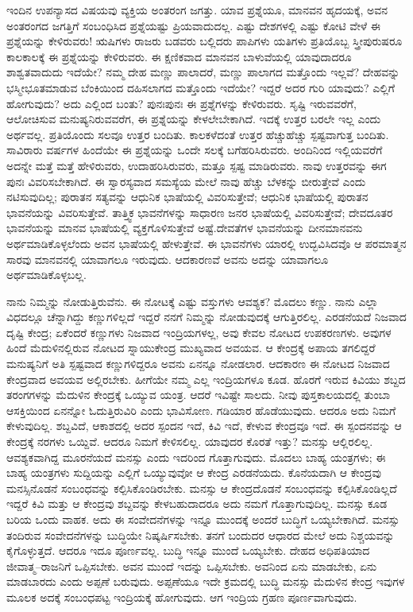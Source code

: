 \vskip 0.2cm

ಇಂದಿನ ಉಪನ್ಯಾಸದ ವಿಷಯವು ವ್ಯಕ್ತಿಯ ಅಂತರಂಗ ಜಗತ್ತು. ಯಾವ ಪ್ರಶ್ನೆಯೂ, ಮಾನವನ ಹೃದಯಕ್ಕೆ, ಅವನ ಅಂತರಂಗದ ಜಗತ್ತಿಗೆ ಸಂಬಂಧಿಸಿದ ಪ್ರಶ್ನೆಯಷ್ಟು ಪ್ರಿಯವಾದುದಲ್ಲ. ಎಷ್ಟು ದೇಶಗಳಲ್ಲಿ ಎಷ್ಟು ಕೋಟಿ ವೇಳೆ ಈ ಪ್ರಶ್ನೆಯನ್ನು ಕೇಳಿರುವರು! ಋಷಿಗಳು ರಾಜರು ಬಡವರು ಬಲ್ಲಿದರು ಪಾಪಿಗಳು ಯತಿಗಳು ಪ್ರತಿಯೊಬ್ಬ ಸ್ತ್ರೀಪುರುಷರೂ ಕಾಲಕಾಲಕ್ಕೆ ಈ ಪ್ರಶ್ನೆಯನ್ನು ಕೇಳಿರುವರು. ಈ ಕ್ಷಣಿಕವಾದ ಮಾನವನ ಬಾಳುವೆಯಲ್ಲಿ ಯಾವುದಾದರೂ ಶಾಶ್ವತವಾದುದು ಇದೆಯೇ? ನಮ್ಮ ದೇಹ ಮಣ್ಣು ಪಾಲಾದರೆ, ಮಣ್ಣು ಪಾಲಾಗದ ಮತ್ತೊಂದು ಇಲ್ಲವೆ? ದೇಹವನ್ನು ಭಸ್ಮೀಭೂತಮಾಡುವ ಬೆಂಕಿಯಿಂದ ದಹಿಸಲಾಗದ ಮತ್ತೊಂದು ಇದೆಯೇ? ಇದ್ದರೆ ಅದರ ಗುರಿ ಯಾವುದು? ಎಲ್ಲಿಗೆ ಹೋಗುವುದು? ಅದು ಎಲ್ಲಿಂದ ಬಂತು? ಪುನಃಪುನಃ ಈ ಪ್ರಶ್ನೆಗಳನ್ನು ಕೇಳಿರುವರು. ಸೃಷ್ಟಿ ಇರುವವರೆಗೆ, ಆಲೋಚಿಸುವ ಮನುಷ್ಯನಿರುವವರೆಗ, ಈ ಪ್ರಶ್ನೆಯನ್ನು ಕೇಳಲೇಬೇಕಾಗಿದೆ. ಇದಕ್ಕೆ ಉತ್ತರ ಬರಲೇ ಇಲ್ಲ ಎಂದು ಅರ್ಥವಲ್ಲ. ಪ್ರತಿಯೊಂದು ಸಲವೂ ಉತ್ತರ ಬಂದಿತು. ಕಾಲಕಳೆದಂತೆ ಉತ್ತರ ಹೆಚ್ಚುಹೆಚ್ಚು ಸ್ಪಷ್ಟವಾಗುತ್ತ ಬಂದಿತು. ಸಾವಿರಾರು ವರ್ಷಗಳ ಹಿಂದೆಯೇ ಈ ಪ್ರಶ್ನೆಯನ್ನು ಒಂದೇ ಸಲಕ್ಕೆ ಬಗೆಹರಿಸಿರುವರು. ಅಂದಿನಿಂದ ಇಲ್ಲಿಯವರೆಗೆ ಅದನ್ನೇ ಮತ್ತೆ ಮತ್ತೆ ಹೇಳಿರುವರು, ಉದಾಹರಿಸಿರುವರು, ಮತ್ತೂ ಸ್ಪಷ್ಟ ಮಾಡಿರುವರು. ನಾವು ಉತ್ತರವನ್ನು ಈಗ ಪುನಃ ವಿವರಿಸಬೇಕಾಗಿದೆ. ಈ ಸ್ವಾರಸ್ಯವಾದ ಸಮಸ್ಯೆಯ ಮೇಲೆ ನಾವು ಹೆಚ್ಚು ಬೆಳಕನ್ನು ಬೀರುತ್ತೇವೆ ಎಂದು ನಟಿಸುವುದಿಲ್ಲ; ಪುರಾತನ ಸತ್ಯವನ್ನು ಆಧುನಿಕ ಭಾಷೆಯಲ್ಲಿ ವಿವರಿಸುತ್ತೇವೆ; ಆಧುನಿಕ ಭಾಷೆಯಲ್ಲಿ ಪುರಾತನ ಭಾವನೆಯನ್ನು ವಿವರಿಸುತ್ತೇವೆ. ತಾತ್ತ್ವಿಕ ಭಾವನೆಗಳನ್ನು ಸಾಧಾರಣ ಜನರ ಭಾಷೆಯಲ್ಲಿ ವಿವರಿಸುತ್ತೇವೆ; ದೇವದೂತರ ಭಾವನೆಯನ್ನು ಮಾನವ ಭಾಷೆಯಲ್ಲಿ ವ್ಯಕ್ತಗೊಳಿಸುತ್ತೇವೆ ಅಷ್ಟೆ.ದೇವತೆಗಳ ಭಾವನೆಯನ್ನು ದೀನಮಾನವನು ಅರ್ಥಮಾಡಿಕೊಳ್ಳಲೆಂದು ಅವನ ಭಾಷೆಯಲ್ಲಿ ಹೇಳುತ್ತೇವೆ. ಈ ಭಾವನೆಗಳು ಯಾರಲ್ಲಿ ಉದ್ಭವಿಸಿದವೊ ಆ ಪರಮಾತ್ಮನ ಸಾರವು ಮಾನವನಲ್ಲಿ ಯಾವಾಗಲೂ ಇರುವುದು. ಆದಕಾರಣವೆ ಅವನು ಅದನ್ನು ಯಾವಾಗಲೂ ಅರ್ಥಮಾಡಿಕೊಳ್ಳಬಲ್ಲ.

\vskip 0.2cm

ನಾನು ನಿಮ್ಮನ್ನು ನೋಡುತ್ತಿರುವೆನು. ಈ ನೋಟಕ್ಕೆ ಎಷ್ಟು ವಸ್ತುಗಳು ಆವಶ್ಯಕ? ಮೊದಲು ಕಣ್ಣು. ನಾನು ಎಲ್ಲಾ ವಿಧದಲ್ಲೂ ಚೆನ್ನಾಗಿದ್ದು ಕಣ್ಣುಗಳಿಲ್ಲದೆ ಇದ್ದರೆ ನನಗೆ ನಿಮ್ಮನ್ನು ನೋಡುವುದಕ್ಕೆ ಆಗುತ್ತಿರಲಿಲ್ಲ. ಎರಡನೆಯದೆ ನಿಜವಾದ ದೃಷ್ಟಿ ಕೇಂದ್ರ; ಏಕೆಂದರೆ ಕಣ್ಣುಗಳು ನಿಜವಾದ ಇಂದ್ರಿಯಗಳಲ್ಲ, ಅವು ಕೇವಲ ನೋಟದ ಉಪಕರಣಗಳು. ಅವುಗಳ ಹಿಂದೆ ಮೆದುಳಿನಲ್ಲಿರುವ ನೋಟದ ಸ್ನಾಯುಕೇಂದ್ರ ಮುಖ್ಯವಾದ ಅವಯವ. ಆ ಕೇಂದ್ರಕ್ಕೆ ಅಪಾಯ ತಗಲಿದ್ದರೆ ಮನುಷ್ಯನಿಗೆ ಅತಿ ಸ್ಪಷ್ಟವಾದ ಕಣ್ಣುಗಳಿದ್ದರೂ ಅವನು ಏನನ್ನೂ ನೋಡಲಾರ. ಆದಕಾರಣ ಈ ನೋಟದ ನಿಜವಾದ ಕೇಂದ್ರವಾದ ಅವಯವ ಅಲ್ಲಿರಬೇಕು. ಹೀಗೆಯೇ ನಮ್ಮ ಎಲ್ಲ ಇಂದ್ರಿಯಗಳೂ ಕೂಡ. ಹೊರಗೆ ಇರುವ ಕಿವಿಯು ಶಬ್ದದ ತರಂಗಗಳನ್ನು ಮೆದುಳಿನ ಕೇಂದ್ರಕ್ಕೆ ಒಯ್ಯುವ ಯಂತ್ರ. ಆದರೆ ಇವಿಷ್ಟೇ ಸಾಲದು. ನೀವು ಪುಸ್ತಕಾಲಯದಲ್ಲಿ ತುಂಬಾ ಆಸಕ್ತಿಯಿಂದ ಏನನ್ನೋ ಓದುತ್ತಿರುವಿರಿ ಎಂದು ಭಾವಿಸೋಣ. ಗಡಿಯಾರ ಹೊಡೆಯುವುದು. ಆದರೂ ಅದು ನಿಮಗೆ ಕೇಳುವುದಿಲ್ಲ. ಶಬ್ದವಿದೆ, ಆಕಾಶದಲ್ಲಿ ಅದರ ಸ್ಪಂದನ ಇದೆ, ಕಿವಿ ಇದೆ, ಕೇಳುವ ಕೇಂದ್ರವೂ ಇದೆ. ಈ ಸ್ಪಂದನವನ್ನು ಆ ಕೇಂದ್ರಕ್ಕೆ ನರಗಳು ಒಯ್ದಿವೆ. ಆದರೂ ನಿಮಗೆ ಕೇಳಿಸಲಿಲ್ಲ. ಯಾವುದರ ಕೊರತೆ ಇತ್ತು? ಮನಸ್ಸು ಆಲ್ಲಿರಲಿಲ್ಲ. ಆವಶ್ಯಕವಾಗಿದ್ದ ಮೂರನೆಯದೆ ಮನಸ್ಸು ಎಂದು ಇದರಿಂದ ಗೊತ್ತಾಗುವುದು. ಮೊದಲು ಬಾಹ್ಯ ಯಂತ್ರಗಳು; ಈ ಬಾಹ್ಯ ಯಂತ್ರಗಳು ಸುದ್ದಿಯನ್ನು ಎಲ್ಲಿಗೆ ಒಯ್ಯುವುವೋ ಆ ಕೇಂದ್ರ ಎರಡನೆಯದು. ಕೊನೆಯದಾಗಿ ಆ ಕೇಂದ್ರವು ಮನಸ್ಸಿನೊಡನೆ ಸಂಬಂಧವನ್ನು ಕಲ್ಪಿಸಿಕೊಂಡಿರಬೇಕು. ಮನಸ್ಸು ಆ ಕೇಂದ್ರದೊಡನೆ ಸಂಬಂಧವನ್ನು ಕಲ್ಪಿಸಿಕೊಂಡಿಲ್ಲದೆ ಇದ್ದರೆ ಕಿವಿ ಮತ್ತು ಆ ಕೇಂದ್ರವು ಶಬ್ದವನ್ನು ಕೇಳಬಹುದಾದರೂ ಅದು ನಮಗೆ ಗೊತ್ತಾಗುವುದಿಲ್ಲ. ಮನಸ್ಸು ಕೂಡ ಬರಿಯ ಒಂದು ವಾಹಕ. ಅದು ಈ ಸಂವೇದನೆಗಳನ್ನು ಇನ್ನೂ ಮುಂದಕ್ಕೆ ಅಂದರೆ ಬುದ್ಧಿಗೆ ಒಯ್ಯಬೇಕಾಗಿದೆ. ಮನಸ್ಸು ತಂದಿರುವ ಸಂವೇದನೆಗಳನ್ನು ಬುದ್ಧಿಯೇ ನಿಷ್ಕರ್ಷಿಸಬೇಕು. ತನಗೆ ಬಂದುದರ ಆಧಾರದ ಮೇಲೆ ಅದು ನಿಶ್ಚಯವನ್ನು ಕೈಗೊಳ್ಳುತ್ತದೆ. ಆದರೂ ಇದೂ ಪೂರ್ಣವಲ್ಲ. ಬುದ್ಧಿ ಇನ್ನೂ ಮುಂದೆ ಒಯ್ಯಬೇಕು. ದೇಹದ ಅಧಿಪತಿಯಾದ ಜೀವಾತ್ಮ–ರಾಜನಿಗೆ ಒಪ್ಪಿಸಬೇಕು. ಅವನ ಮುಂದೆ ಇದನ್ನು ಒಪ್ಪಿಸಬೇಕು. ಅವನಿಂದ ಏನು ಮಾಡಬೇಕು, ಏನು ಮಾಡಬಾರದು ಎಂದು ಅಪ್ಪಣೆ ಬರುವುದು. ಅಪ್ಪಣೆಯೂ ಇದೇ ಕ್ರಮದಲ್ಲಿ ಬುದ್ಧಿ ಮನಸ್ಸು ಮೆದುಳಿನ ಕೇಂದ್ರ ಇವುಗಳ ಮೂಲಕ ಅದಕ್ಕೆ ಸಂಬಂಧಪಟ್ಟ ಇಂದ್ರಿಯಕ್ಕೆ ಹೋಗುವುದು. ಆಗ ಇಂದ್ರಿಯ ಗ್ರಹಣ ಪೂರ್ಣವಾಗುವುದು.


